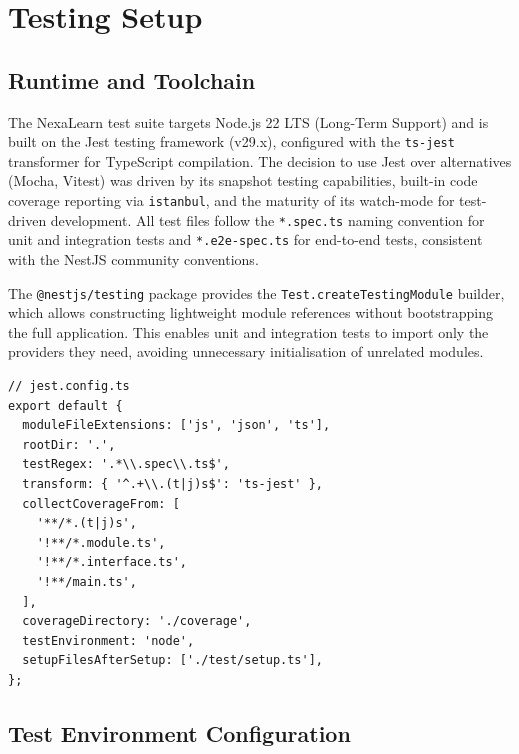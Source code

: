 
\section{Testing Setup}
\label{sec:testing-setup}

\subsection{Runtime and Toolchain}

The NexaLearn test suite targets Node.js 22 LTS (Long-Term Support) and is built on the Jest testing framework (v29.x), configured with the \texttt{ts-jest} transformer for TypeScript compilation. The decision to use Jest over alternatives (Mocha, Vitest) was driven by its snapshot testing capabilities, built-in code coverage reporting via \texttt{istanbul}, and the maturity of its watch-mode for test-driven development. All test files follow the \texttt{*.spec.ts} naming convention for unit and integration tests and \texttt{*.e2e-spec.ts} for end-to-end tests, consistent with the NestJS community conventions.

The \texttt{@nestjs/testing} package provides the \texttt{Test.createTestingModule} builder, which allows constructing lightweight module references without bootstrapping the full application. This enables unit and integration tests to import only the providers they need, avoiding unnecessary initialisation of unrelated modules.

\begin{lstlisting}[caption=Jest configuration excerpt for unit and integration tests,label=lst:jest-config]
// jest.config.ts
export default {
  moduleFileExtensions: ['js', 'json', 'ts'],
  rootDir: '.',
  testRegex: '.*\\.spec\\.ts$',
  transform: { '^.+\\.(t|j)s$': 'ts-jest' },
  collectCoverageFrom: [
    '**/*.(t|j)s',
    '!**/*.module.ts',
    '!**/*.interface.ts',
    '!**/main.ts',
  ],
  coverageDirectory: './coverage',
  testEnvironment: 'node',
  setupFilesAfterSetup: ['./test/setup.ts'],
};
\end{lstlisting}

\subsection{Test Environment Configuration}

